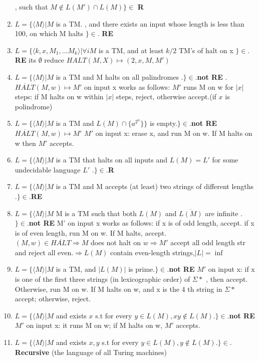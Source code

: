 \documentclass[10pt,landscape]{article}
\theoremstyle{plain}%
\theoremstyle{definition}
\theoremstyle{remark}
\begin{document}
\begin{multicols}{3}
\begin{enumerate}
, such that $M\notin L(M')\cap L(M) \}\in $\textbf{ R}
\item $ L=\{ \langle M\rangle | M $ is a TM. , and there exists an input whose length is less than 100, on which M
halts $\}\in.$\textbf{ RE}
\item $ L=\{ \langle k,x,M_1,\dots M_k\rangle | \forall i M$ is a TM, and at least $k/2$ TM’s of  halt on x $\}\in.$\textbf{ RE} its $\emptyset$ reduce $HALT(M,X) \mapsto (2,x,M,M')$
\item $ L=\{ \langle M \rangle |M$ is a TM and M halts on all palindromes .$\}\in.$\textbf{not RE} .$\overline{HALT}(M,w)\mapsto M'$ on input x works as follows: $M'$
runs M on w for $|x|$ steps: if M halts on w within $|x|$ 
steps, reject, otherwise accept.(if $x$ is polindrome)
\item $ L=\{ \langle M \rangle |M$ is a TM and $L(M)\cap \{a^{2^n}\}\} $ is empty.$\}\in.$\textbf{not RE}
$\overline{HALT}(M,w)\mapsto M'$ $M'$ on input x: erase x, and run M on w. If M halts on w then $M'$
accepts.
\item $ L=\{ \langle M \rangle |M$ is a TM that halts on all inputs and $L(M) = L'$
for some undecidable language
$L'$ .$\}\in.$\textbf{R}
\item $ L=\{ \langle M \rangle |M$ is a TM and M accepts (at least) two strings of different lengths .$\}\in.$\textbf{RE}
\item $ L=\{ \langle M \rangle |M$ M is a TM such that both $L(M)$ and $\overline{ L(M)}$ are infinite .$\}\in.$\textbf{not RE}
M' on input x works as follows:
if x is of odd length, accept.
if x is of even length, run M on w. If M halts, accept.\\$(M,w)\in \overline{HALT} \Rightarrow M$ does not halt on $w\Rightarrow M'$ accept all odd length str and reject all even.$\Rightarrow L(M)$ contain even-length strings,$|L|=\inf$   
\item $ L=\{ \langle M \rangle |M$ is a TM, and $|L(M)|$ is prime.$\}\in.$\textbf{not RE}
$M'$ on input x:
if x is one of the first three strings (in lexicographic order) of $\Sigma*$
, then accept.
Otherwise, run M on w. If M halts on w, and x is the 4
th string in $\Sigma*$
accept; otherwise,
reject.
\item $ L=\{ \langle M \rangle |M$ and exists $x$ s.t for every $y\in L(M),xy\notin L(M) .\}\in.$\textbf{not RE} $M'$  on input x:
it runs M on w; if M halts on w, $M'$
accepts.
\item $ L=\{ \langle M \rangle |M$ and exists $x,y$ s.t for every $y\in L(M),y\notin L(M) .\}\in.$\textbf{Recursive} (the language of all Turing machines)

\end{enumerate}
\end{multicols}
\end{document}
